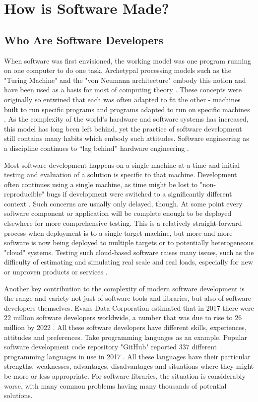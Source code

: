 \chapter{How is Software Made?}
\label{chapter:who}

\section{Who Are Software Developers}
\label{section:who are software developers}

When software was first envisioned, the working model was one program running on one computer to do one task. Archetypal processing models such as the "Turing Machine" and the "von Neumann architecture" embody this notion and have been used as a basis for most of computing theory \citep{Agar2001}. These concepts were originally so entwined that each was often adapted to fit the other - machines built to run specific programs and programs adapted to run on specific machines \citep{Cortada2006}. As the complexity of the world's hardware and software systems has increased, this model has long been left behind, yet the practice of software development still contains many habits which embody such attitudes. Software engineering as a discipline continues to “lag behind” hardware engineering \citep{Wirth2008}.

Most software development happens on a single machine at a time and initial testing and evaluation of a solution is specific to that machine. Development often continues using a single machine, as time might be lost to "non-reproducible" bugs if development were switched to a significantly different context \citep{ErfaniJoorabchi2014}. Such concerns are usually only delayed, though. At some point every software component or application will be complete enough to be deployed elsewhere for more comprehensive testing. This is a relatively straight-forward process when deployment is to a single target machine, but more and more software is now being deployed to multiple targets or to potentially heterogeneous "cloud" systems. Testing such cloud-based software raises many issues, such as the difficulty of estimating and simulating real scale and real loads, especially for new or unproven products or services \citep{Zhou2013}.

Another key contribution to the complexity of modern software development is the range and variety not just of software tools and libraries, but also of software developers themselves. Evans Data Corporation estimated that in 2017 there were 22 million software developers worldwide, a number that was due to rise to 26 million by 2022 \citep{EvansDataCorporation2018}. All these software developers have different skills, experiences, attitudes and preferences. Take programming languages as an example. Popular software development code repository "GitHub" reported 337 different programming languages in use in 2017 \citep{Github2017}. All these languages have their particular strengths, weaknesses, advantages, disadvantages and situations where they might be more or less appropriate. For software libraries, the situation is considerably worse, with many common problems having many thousands of potential solutions.

